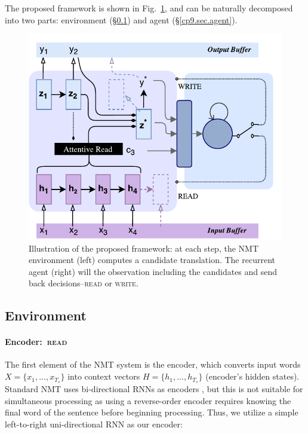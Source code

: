 The proposed framework is shown in Fig.~\ref{cp9.fig.snmt}, and can be naturally decomposed into two parts: environment (\S\ref{cp9.sec.environment}) and agent (\S\ref{cp9.sec.agent}).
\begin{figure}[hptb]
   	\centering
          	\includegraphics[width=0.9\linewidth]{figs/simultrans/SNMT.pdf} 
          	\caption{\label{cp9.fig.snmt} {Illustration of the proposed framework: at each step, the NMT environment (left) computes a candidate translation. The recurrent agent (right) will the observation including the candidates and send back decisions--\textsc{read} or \textsc{write}.}} 
  \end{figure} 
  
\subsection{Environment}
\label{cp9.sec.environment}
\paragraph{Encoder:~\textsc{read}} 
The first element of the NMT system is the encoder, which converts input words $X=\{x_1, ..., x_{T_s}\}$ into context vectors $H = \{h_1, ..., h_{T_s}\}$ (encoder's hidden states).
Standard NMT uses bi-directional RNNs as encoders \cite{bahdanau2014neural}, but this is not suitable for simultaneous processing as using a reverse-order encoder requires knowing the final word of the sentence before beginning processing.
Thus, we utilize a simple left-to-right uni-directional RNN as our encoder:

